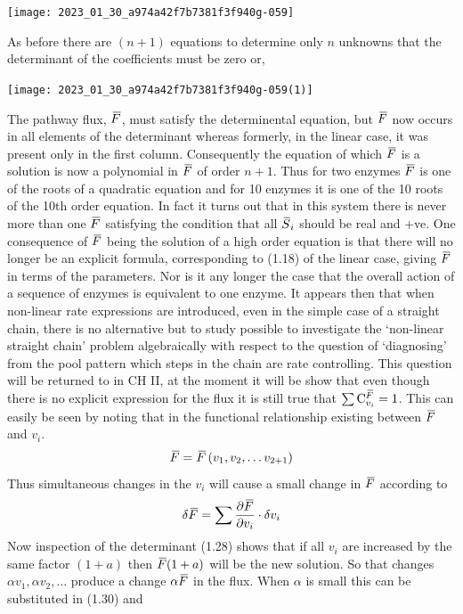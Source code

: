\begin{center}
\texttt{[image: 2023\_01\_30\_a974a42f7b7381f3f940g-059]}
\end{center}

As before there are $(n+1)$ equations to determine only $n$ unknowns that the determinant of the coefficients must be zero or,

\begin{center}
\texttt{[image: 2023\_01\_30\_a974a42f7b7381f3f940g-059(1)]}
\end{center}

The pathway flux, $\,\overline{\!{F}}$, must satisfy the determinental equation, but $\,\overline{\!{F}}$ now occurs in all elements of the determinant whereas formerly, in the linear case, it was present only in the first column. Consequently the equation of which $\,\overline{\!{F}}$ is a solution is now a polynomial in $\,\overline{\!{F}}$ of order $n+1$. Thus for two enzymes $\,\overline{\!{F}}$ is one of the roots of a quadratic equation and for 10 enzymes it is one of the 10 roots of the 10th order equation. In fact it turns out that in this system there is never more than one $\,\overline{\!{F}}$ satisfying the condition that all $\,\overline{\!{S}}_i$ should be real and +ve. One consequence of $\,\overline{\!{F}}$ being the solution of a high order equation is that there will no longer be an explicit formula, corresponding to (1.18) of the linear case, giving $\,\overline{\!{F}}$ in terms of the parameters. Nor is it any longer the case that the overall action of a sequence of enzymes is equivalent to one enzyme. It appears then that when non-linear rate expressions are introduced, even in the simple case of a straight chain, there is no alternative but to study possible to investigate the `non-linear straight chain' problem algebraically with respect to the question of `diagnosing' from the pool pattern which steps in the chain are rate controlling. This question will be returned to in CH II, at the moment it will be show that even though there is no explicit expression for the flux it is still true that $\sum \mathrm{C}_{v_i}^{\,\overline{\!{F}}}=1$. This can easily be seen by noting that in the functional relationship existing between $\,\overline{\!{F}}$ and $v_{i}$.
%
$$
\,\overline{\!{F}} = \,\overline{\!{F}}\left(v_1, v_2, \ldots v_{2+1}\right)
$$
Thus simultaneous changes in the $v_i$ will cause a small change in $\,\overline{\!{F}}$ according to
%
\begin{equation}
\delta \,\overline{\!{F}}= \sum \frac{\partial \,\overline{\!{F}}}{\partial v_{i}} \cdot \delta v_{i}
\label{eqn:130}
\end{equation}
%
Now inspection of the determinant (1.28) shows that if all $v_{i}$ are increased by the same factor $(1+a)$ then $\,\overline{\!{F}}(1+a)$ will be the new solution. So that changes $\alpha v_{1}, \alpha v_{2}, \dots$ produce a change $\alpha \,\overline{\!{F}}$ in the flux. When $\alpha$ is small this can be substituted in (1.30) and

